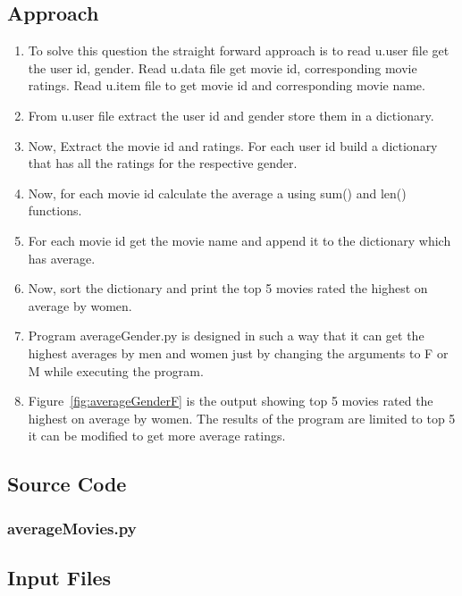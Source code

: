 \documentclass[12pt]{article}
\begin{document}
\subsection{Approach}
\begin{enumerate}
    \item To solve this question the straight forward approach is to read u.user file get the user id, gender. Read u.data file get movie id, corresponding movie ratings. Read u.item file to get movie id and corresponding movie name.
	\item From u.user file extract the user id and gender store them in a dictionary.     
    \item Now, Extract the movie id and ratings. For each user id build a dictionary that has all the ratings for the respective gender.
    \item Now, for each movie id calculate the average a using sum() and len() functions.
    \item For each movie id get the movie name and append it to the dictionary which has average.
    \item Now, sort the dictionary and print the top 5 movies rated the highest on average by women.
    \item Program averageGender.py is designed in  such a way that it can get the highest averages by men and women just by changing the arguments to F or M while executing the program.
    \item Figure~\ref{fig:averageGenderF} is the output showing top 5 movies rated the highest on average by women. The results of the program are limited to  top 5 it can be modified to get more average ratings. 
\end{enumerate}


\newpage
\subsection{Source Code}
\subsubsection{averageMovies.py}

\newpage

\subsection{Input Files}
\end{document}
